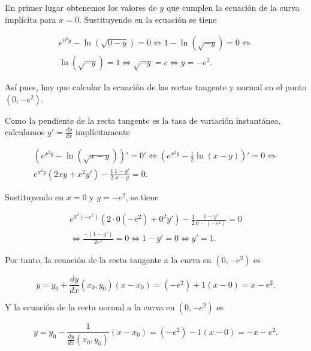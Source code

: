 \documentclass[
  a4paper,
]{scrreport}
\theoremstyle{definition}
\theoremstyle{remark}
\begin{document}
\begin{tcolorbox}[enhanced jigsaw, colframe=quarto-callout-tip-color-frame, opacitybacktitle=0.6, colbacktitle=quarto-callout-tip-color!10!white, rightrule=.15mm, toptitle=1mm, opacityback=0, title=\textcolor{quarto-callout-tip-color}{\faLightbulb}\hspace{0.5em}{Solución}, arc=.35mm, toprule=.15mm, breakable, bottomtitle=1mm, titlerule=0mm, bottomrule=.15mm, leftrule=.75mm, coltitle=black, left=2mm, colback=white]

En primer lugar obtenemos los valores de \(y\) que cumplen la ecuación
de la curva implícita para \(x=0\). Sustituyendo en la ecuación se tiene

\[\begin{gathered} e^{0^2y}-\ln(\sqrt{0-y})= 0 \Leftrightarrow 1-\ln(\sqrt{-y}) = 0 \Leftrightarrow \\
\ln(\sqrt{-y}) = 1 \Leftrightarrow  \sqrt{-y} = e \Leftrightarrow y=-e^2. \end{gathered}\]

Así pues, hay que calcular la ecuación de las rectas tangente y normal
en el punto \((0,-e^2)\).

Como la pendiente de la recta tangente es la tasa de variación
instantánea, calculamos \(y'=\frac{dy}{dx}\) implícitamente

\[\begin{gathered} \left(e^{x^2y}-\ln(\sqrt{x-y})\right)'= 0' \Leftrightarrow \left(e^{x^2y}-\frac{1}{2}\ln(x-y)\right)'= 0 \Leftrightarrow \\
e^{x^2y}(2xy+x^2y')-\frac{1}{2}\frac{1-y'}{x-y} = 0. \end{gathered}\]

Sustituyendo en \(x=0\) y \(y=-e^2\), se tiene

\[\begin{gathered} e^{0^2(-e^2)}(2\cdot0(-e^2)+0^2y')-\frac{1}{2}\frac{1-y'}{0-(-e^2)} = 0 \\
\Leftrightarrow \frac{-(1-y')}{2e^2} =0 \Leftrightarrow 1-y' = 0 \Leftrightarrow y'=1. \end{gathered}\]

Por tanto, la ecuación de la recta tangente a la curva en \((0,-e^2)\)
es

\[y = y_0 + \frac{dy}{dx}(x_0,y_0) (x-x_0) = (-e^2)+1(x-0) = x-e^2.\]

Y la ecuación de la recta normal a la curva en \((0,-e^2)\) es

\[y = y_0 - \frac{1}{\frac{dy}{dx}(x_0,y_0)} (x-x_0) = (-e^2)-1(x-0) = -x-e^2.\]

\end{tcolorbox}
\end{document}
